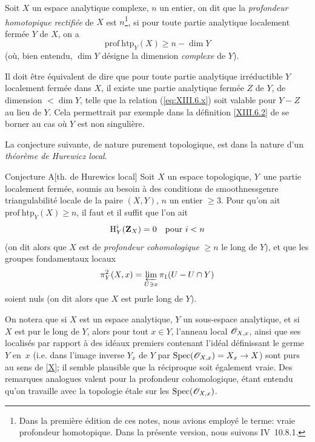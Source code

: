 \begin{supdefinition} \label{XIII.6.2}
Soit $X$ un espace analytique complexe, $n$ un entier, on dit que la \emph{profondeur homotopique rectifiée} de $X$ est $n$\footnote{Dans la premi\`ere \'edition de ces notes, nous avions employ\'e le terme: \og vraie profondeur homotopique\fg. Dans la pr\'esente version, nous suivons \EGA IV~10.8.1.}, si pour toute partie analytique localement ferm\'ee $Y$ de $X$, on a
\begin{equation*} \label{eq:XIII.6.x} \tag{$x$} {\mathrm{prof\:htp}_Y(X)\geq n-\dim Y}
\end{equation*}
(o\`u, bien entendu, $\dim Y$ d\'esigne la dimension \emph{complexe} de $Y$).
\end{supdefinition}

Il doit \^etre \'equivalent de dire que pour toute partie analytique irr\'eductible $Y$ localement ferm\'ee dans $X$, il existe une partie analytique ferm\'ee $Z$ de $Y$, de dimension $<\dim Y$, telle que la relation (\ref{eq:XIII.6.x}) soit valable pour $Y-Z$ au lieu de $Y$. Cela permettrait par exemple dans la d\'efinition \ref{XIII.6.2} de se borner au cas o\`u $Y$ est non singuli\`ere.

\enlargethispage{\baselineskip}%
La conjecture suivante, de nature purement topologique, est dans la nature d'un \og \emph{théorème de Hurewicz local}\fg.

 \label{XIII.6.A}
\begin{enonce*}{Conjecture A}[\og th. de Hurewics local{\fg}\ndemark]
Soit $X$ un espace topologique, $Y$~une partie localement ferm\'ee, soumis au besoin \`a des conditions de \og smoothness\fg genre triangulabilit\'e locale de la paire $(X, Y)$, $n$ un entier $\geq 3$. Pour qu'on ait $\mathrm{prof\:htp}_Y(X)\geq n$, il faut et il suffit que l'on ait
$$
\operatorname{H}^i_Y(\mathbf{Z}_X)=0\quad\text{pour } i<n$$
(on dit alors que $X$ est de \emph{profondeur cohomologique} $\geq n$ le long de $Y$), et que les groupes fondamentaux locaux
$$
\pi^2_Y(X, x)=\varprojlim_{U\ni x} \pi_1(U-U\cap Y)$$
soient nuls (on dit alors que $X$ est \og pur\fg le long de $Y$).
\end{enonce*}

On notera que si $X$ est un espace analytique, $Y$ un sous-espace analytique, et si~$X$ est pur le long de $Y$, alors pour tout $x\in Y$, l'anneau local $\mathscr{O}_{X, x}$, ainsi que ses localis\'es par rapport \`a des id\'eaux premiers contenant l'id\'eal d\'efinissant le germe~$Y$ en~$x$ (i.e. dans l'image inverse $Y_x$ de $Y$ par $\Spec(\OXx)=X_x\to X$) sont purs au sens de \Exp \ref{X}; il semble plausible que la r\'eciproque soit \'egalement vraie. Des remarques analogues valent pour la profondeur cohomologique, \'etant entendu qu'on travaille avec la topologie \'etale sur les $\operatorname{Spec}(\mathscr{O}_{X, x})$.

